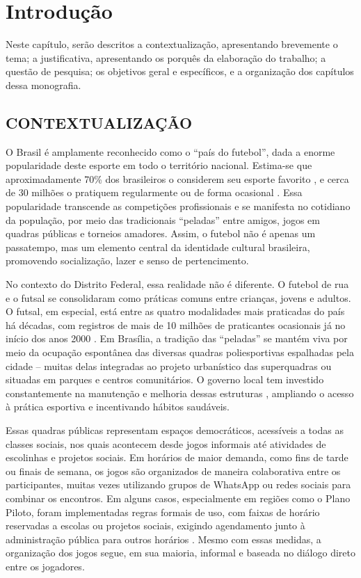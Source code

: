 \chapter[Introdução]{Introdução}

Neste capítulo, serão descritos a contextualização, apresentando brevemente o
tema; a justificativa, apresentando os porquês da elaboração do trabalho; a questão de
pesquisa; os objetivos geral e específicos, e a organização dos capítulos dessa monografia.

\section{CONTEXTUALIZAÇÃO}

O Brasil é amplamente reconhecido como o “país do futebol”, dada a enorme popularidade deste esporte em todo o território nacional. Estima-se que aproximadamente 70\% dos brasileiros o considerem seu esporte favorito \cite{gente2023}, e cerca de 30 milhões o pratiquem regularmente ou de forma ocasional \cite{sportbay2022}. Essa popularidade transcende as competições profissionais e se manifesta no cotidiano da população, por meio das tradicionais “peladas” entre amigos, jogos em quadras públicas e torneios amadores. Assim, o futebol não é apenas um passatempo, mas um elemento central da identidade cultural brasileira, promovendo socialização, lazer e senso de pertencimento.

No contexto do Distrito Federal, essa realidade não é diferente. O futebol de rua e o futsal se consolidaram como práticas comuns entre crianças, jovens e adultos. O futsal, em especial, está entre as quatro modalidades mais praticadas do país há décadas, com registros de mais de 10 milhões de praticantes ocasionais já no início dos anos 2000 \cite{foothub2022}. Em Brasília, a tradição das “peladas” se mantém viva por meio da ocupação espontânea das diversas quadras poliesportivas espalhadas pela cidade – muitas delas integradas ao projeto urbanístico das superquadras ou situadas em parques e centros comunitários. O governo local tem investido constantemente na manutenção e melhoria dessas estruturas \cite{segov2023}, ampliando o acesso à prática esportiva e incentivando hábitos saudáveis.

Essas quadras públicas representam espaços democráticos, acessíveis a todas as classes sociais, nos quais acontecem desde jogos informais até atividades de escolinhas e projetos sociais. Em horários de maior demanda, como fins de tarde ou finais de semana, os jogos são organizados de maneira colaborativa entre os participantes, muitas vezes utilizando grupos de WhatsApp ou redes sociais para combinar os encontros. Em alguns casos, especialmente em regiões como o Plano Piloto, foram implementadas regras formais de uso, com faixas de horário reservadas a escolas ou projetos sociais, exigindo agendamento junto à administração pública para outros horários \cite{correio2023}. Mesmo com essas medidas, a organização dos jogos segue, em sua maioria, informal e baseada no diálogo direto entre os jogadores.

